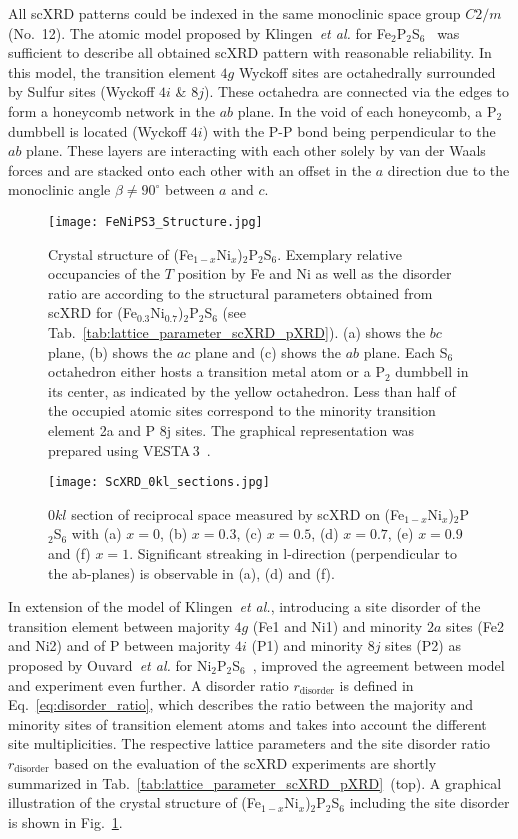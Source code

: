 \documentclass[twocolumn,superscriptaddress,prb,preprintnumbers,nobibnotes,aps]{revtex4-2}  %
\begin{document}
All scXRD patterns could be indexed in the same monoclinic space group $C2/m$ (No.~12). The atomic model proposed by Klingen~\textit{et al.} for Fe$_2$P$_2$S$_6$~\cite{Klingen1973} was sufficient to describe all obtained scXRD pattern with reasonable reliability. In this model, the transition element $4g$ Wyckoff sites are octahedrally surrounded by Sulfur sites (Wyckoff $4i$ \& $8j$). These octahedra are connected via the edges to form a honeycomb network in the $ab$ plane. In the void of each honeycomb, a P$_2$ dumbbell is located (Wyckoff $4i$) with the P-P bond being perpendicular to the $ab$ plane. These layers are interacting with each other solely by van der Waals forces and are stacked onto each other with an offset in the $a$ direction due to the monoclinic angle $\beta \neq 90^\circ$ between $a$ and $c$.

\begin{figure}[tb]
\texttt{[image: FeNiPS3\_Structure.jpg]}
\caption{Crystal structure of (Fe$_{1-x}$Ni$_x$)$_2$P$_2$S$_6$. Exemplary relative occupancies of the $T$ position by Fe and Ni as well as the disorder ratio are according to the structural parameters obtained from scXRD for (Fe$_{0.3}$Ni$_{0.7}$)$_2$P$_2$S$_6$ (see Tab.~\ref{tab:lattice_parameter_scXRD_pXRD}). (a) shows the $bc$ plane, (b) shows the $ac$ plane and (c) shows the $ab$ plane. Each S$_6$ octahedron either hosts a transition metal atom or a P$_2$ dumbbell in its center, as indicated by the yellow octahedron. Less than half of the occupied atomic sites correspond to the minority transition element 2a and P 8j sites. The graphical representation was prepared using VESTA\,3~\cite{KMomma2011}.}
\label{fig:crystal_structure}
\end{figure}

\begin{figure}[tb]
\texttt{[image: ScXRD\_0kl\_sections.jpg]}
\caption{
$0kl$ section of reciprocal space measured by scXRD on (Fe$_{1-x}$Ni$_{x}$)$_2$P$_2$S$_6$ with
(a) $x = 0$, (b) $x = 0.3$, (c) $x = 0.5$, (d) $x = 0.7$, (e) $x = 0.9$ and (f) $x = 1$. Significant streaking
in l-direction (perpendicular to the ab-planes) is observable in (a), (d) and (f).
}
\label{fig:scXRD_0kl}
\end{figure}

In extension of the model of Klingen~\textit{et al.}, introducing a site disorder of the transition element between majority $4g$ (Fe1 and Ni1) and minority $2a$ sites (Fe2 and Ni2) and of P between majority $4i$ (P1) and minority $8j$ sites (P2) as proposed by Ouvard~\textit{et al.} for Ni$_2$P$_2$S$_6$~\cite{Ouvrard1985}, improved the agreement between model and experiment even further. A disorder ratio $r_\textrm{disorder}$ is defined in Eq.~\ref{eq:disorder_ratio}, which describes the ratio between the majority and minority sites of transition element atoms and takes into account the different site multiplicities. The respective lattice parameters and the site disorder ratio $r_\textrm{disorder}$ based on the evaluation of the scXRD experiments are shortly summarized in Tab.~\ref{tab:lattice_parameter_scXRD_pXRD}~(top). A graphical illustration of the crystal structure of (Fe$_{1-x}$Ni$_x$)$_2$P$_2$S$_6$ including the site disorder is shown in Fig.~\ref{fig:crystal_structure}.
\end{document}
